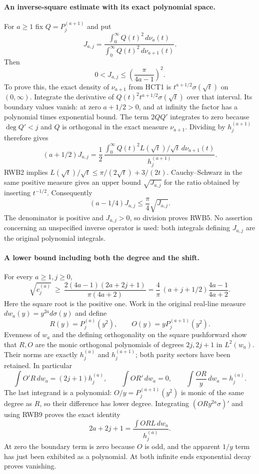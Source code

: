 \documentclass[11pt,a4paper]{article}
\begin{document}
\paragraph{An inverse-square estimate with its exact polynomial space.}
For $a\ge1$ fix $Q=P_j^{(a+1)}$ and put
\[
 J_{a,j}=
 \frac{\int_0^\infty Q(t)^2\,d\nu_a(t)}
      {\int_0^\infty Q(t)^2\,d\nu_{a+1}(t)}.
\]
Then
\[
 0<J_{a,j}\le\left(\frac{\pi}{4a-1}\right)^2.
 \tag{RWB5}
\]
To prove this, the exact density of $\nu_{a+1}$ from HCT1 is
$t^{a+1/2}\sigma(\sqrt t)$ on $(0,\infty)$. Integrate the derivative
of $Q(t)^2t^{a+1/2}\sigma(\sqrt t)$ over that interval. Its boundary
values vanish: at zero $a+1/2>0$, and at infinity the factor has a
polynomial times exponential bound. The term $2QQ'$ integrates to
zero because $\deg Q'<j$ and $Q$ is orthogonal in the exact measure
$\nu_{a+1}$. Dividing by $h_j^{(a+1)}$ therefore gives
\[
 (a+1/2)J_{a,j}
 =\frac12\,\frac{\int_0^\infty
                 Q(t)^2 L(\sqrt t)/\sqrt t\,d\nu_{a+1}(t)}
                    {h_j^{(a+1)}}.
 \tag{RWB6}
\]
RWB2 implies $L(\sqrt t)/\sqrt t\le
\pi/(2\sqrt t)+3/(2t)$. Cauchy--Schwarz in the same positive measure
gives an upper bound $\sqrt{J_{a,j}}$ for the ratio obtained by
inserting $t^{-1/2}$. Consequently
\[
 (a-1/4)J_{a,j}\le\frac\pi4\sqrt{J_{a,j}}.
\]
The denominator is positive and $J_{a,j}>0$, so division proves RWB5.
No assertion concerning an unspecified inverse operator is used: both
integrals defining $J_{a,j}$ are the original polynomial integrals.

\paragraph{A lower bound including both the degree and the shift.}
For every $a\ge1,j\ge0$,
\[
 \boxed{\displaystyle
 \sqrt{c_j^{(a)}}\ \ge\
 \frac{2(4a-1)(2a+2j+1)}{\pi(4a+2)}
 =\frac4\pi\,(a+j+1/2)\frac{4a-1}{4a+2}.}
 \tag{RWB7}
\]
Here the square root is the positive one. Work in the original
real-line measure $dw_a(y)=y^{2a}d\sigma(y)$ and define
\[
 R(y)=P_j^{(a)}(y^2),\qquad
 O(y)=yP_j^{(a+1)}(y^2).
 \tag{RWB8}
\]
Evenness of $w_a$ and the defining orthogonality on the square
pushforward show that $R,O$ are the monic orthogonal polynomials of
degrees $2j,2j+1$ in $L^2(w_a)$. Their norms are exactly
$h_j^{(a)}$ and $h_j^{(a+1)}$; both parity sectors have been retained.
In particular
\[
 \int O'R\,dw_a=(2j+1)h_j^{(a)},\qquad
 \int OR'\,dw_a=0,\qquad
 \int\frac{OR}{y}\,dw_a=h_j^{(a)}.
 \tag{RWB9}
\]
The last integrand is a polynomial: $O/y=P_j^{(a+1)}(y^2)$ is monic
of the same degree as $R$, so their difference has lower degree.
Integrating $(ORy^{2a}\sigma)'$ and using RWB9 proves the exact identity
\[
 2a+2j+1=\frac{\int OR L\,dw_a}{h_j^{(a)}}.
 \tag{RWB10}
\]
At zero the boundary term is zero because $O$ is odd, and the apparent
$1/y$ term has just been exhibited as a polynomial. At both infinite
ends exponential decay proves vanishing.
\end{document}

